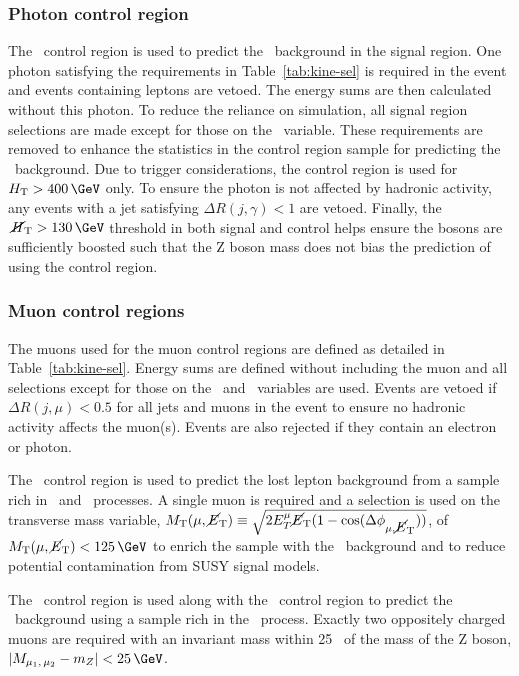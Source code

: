\subsubsection{Photon control region}
The \gj~control region is used to predict the \znunu~background in the signal region.
One photon satisfying the requirements in Table~\ref{tab:kine-sel} is required in the 
event and events containing leptons are vetoed. The energy sums are then calculated without this photon. 
To reduce the reliance on simulation, all signal region selections are made except for 
those on the \bdphi~variable. These requirements are removed to enhance 
the statistics in the control region sample 
for predicting the \znunu~background. Due to trigger considerations, the \gj control region
is used for $\scalht > 400\,\GeV$ only. To ensure the photon is not affected by hadronic
activity, any events with a jet satisfying $\Delta R(j,\gamma) < 1$ are vetoed. Finally,
the $\mht > 130\,\GeV$ threshold in both signal and control helps ensure the bosons are 
sufficiently boosted such that the Z boson mass does not bias the 
prediction of \znunu using the \gj control region.

\subsubsection{Muon control regions}
The muons used for the muon control regions are defined as detailed in
Table~\ref{tab:kine-sel}. Energy sums are defined without including the muon 
and all selections except for those on the \bdphi~and \alphat~variables are used.
Events are vetoed if $\Delta R(j,\mu) < 0.5$ for all jets and muons in the event to
ensure no hadronic activity affects the muon(s). Events are also rejected if they 
contain an electron or photon.

The \mj~control region is used to predict the lost lepton background from 
a sample rich in \wj~and \ttbar~processes. A single muon is required and a selection is used on the transverse mass variable,
$M_{\textrm{T}}(\mu,\mbox{$\cancel{E}_\text{T}$}) \equiv \sqrt{2E^{\mu}_{T}\mbox{$\cancel{E}_\text{T}$}(1-\cos(\Delta\phi_{\mu,\mbox{$\cancel{E}_\text{T}$}}))}$,
of $\mt(\mu,\met) < 125\,\GeV$ to enrich the sample with the \wj~background 
and to reduce potential contamination from SUSY signal models.

The \mmj~control region is used along with the \gj~control region to predict the \znunu~background
using a sample rich in the \zmmj~process. Exactly two oppositely charged muons are required with
an invariant mass within 25 \GeV~of the mass of the Z boson, $|M_{\mu_1,\,\mu_2} - m_Z| < 25\,\GeV$.

